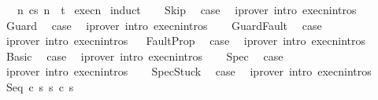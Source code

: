 \begin{isabellebody}
\ \ \ {\isachardoublequoteopen}{\isasymexists}n{\isachardot}\ {\isasymGamma}{\isasymturnstile}{\isasymlangle}c{\isacharcomma}s{\isasymrangle}\ {\isacharequal}n{\isasymRightarrow}\ \ t{\isachardoublequoteclose}\isanewline
%
\isadelimproof
%
\endisadelimproof
%
\isatagproof
{}\isamarkupfalse%
\ execn\isanewline
{}\isamarkupfalse%
\ {\isacharparenleft}induct{\isacharparenright}\isanewline
\ \ \isamarkupfalse%
\ Skip\ \isamarkupfalse%
\ {\isacharquery}case\ \isamarkupfalse%
\ {\isacharparenleft}iprover\ intro{\isacharcolon}\ execn{\isachardot}intros{\isacharparenright}\isanewline
{}\isamarkupfalse%
\isanewline
\ \ \isamarkupfalse%
\ Guard\ \isamarkupfalse%
\ {\isacharquery}case\ \isamarkupfalse%
\ {\isacharparenleft}iprover\ intro{\isacharcolon}\ execn{\isachardot}intros{\isacharparenright}\isanewline
{}\isamarkupfalse%
\isanewline
\ \ \isamarkupfalse%
\ GuardFault\ \isamarkupfalse%
\ {\isacharquery}case\ \isamarkupfalse%
\ {\isacharparenleft}iprover\ intro{\isacharcolon}\ execn{\isachardot}intros{\isacharparenright}\isanewline
{}\isamarkupfalse%
\isanewline
\ \isamarkupfalse%
\ FaultProp\ \isamarkupfalse%
\ {\isacharquery}case\ \isamarkupfalse%
\ {\isacharparenleft}iprover\ intro{\isacharcolon}\ execn{\isachardot}intros{\isacharparenright}\isanewline
{}\isamarkupfalse%
\isanewline
\ \ \isamarkupfalse%
\ Basic\ \isamarkupfalse%
\ {\isacharquery}case\ \isamarkupfalse%
\ {\isacharparenleft}iprover\ intro{\isacharcolon}\ execn{\isachardot}intros{\isacharparenright}\isanewline
{}\isamarkupfalse%
\isanewline
\ \ \isamarkupfalse%
\ Spec\ \isamarkupfalse%
\ {\isacharquery}case\ \isamarkupfalse%
\ {\isacharparenleft}iprover\ intro{\isacharcolon}\ execn{\isachardot}intros{\isacharparenright}\isanewline
{}\isamarkupfalse%
\isanewline
\ \ \isamarkupfalse%
\ SpecStuck\ \isamarkupfalse%
\ {\isacharquery}case\ \isamarkupfalse%
\ {\isacharparenleft}iprover\ intro{\isacharcolon}\ execn{\isachardot}intros{\isacharparenright}\isanewline
{}\isamarkupfalse%
\isanewline
\ \ \isamarkupfalse%
\ {\isacharparenleft}Seq\ c{}\ s\ s{\isacharprime}\ c{}\ s{\isacharprime}{\isacharprime}{\isacharparenright}\isanewline

\end{isabellebody}

